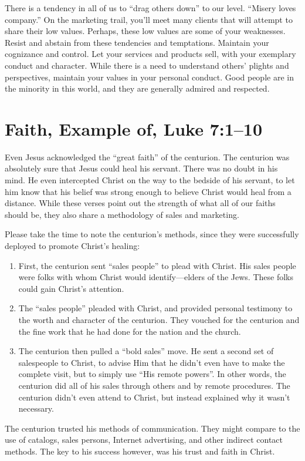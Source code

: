 \documentclass[12pt]{memoir}
\begin{document}
There is a tendency in all of us to ``drag others down'' to our
level. ``Misery loves company.'' On the marketing trail, you'll
meet many clients that will attempt to share their low values. Perhaps,
these low values are some of your weaknesses. Resist and abstain from
these tendencies and temptations. Maintain your cognizance and control.
Let your services and products sell, with your exemplary conduct and
character. While there is a need to understand others' plights and
perspectives, maintain your values in your personal conduct. Good
people are in the minority in this world, and they are generally admired
and respected. 

\section{Faith, Example of, Luke 7:1--10}

Even Jesus acknowledged the ``great faith'' of the centurion. The
centurion was absolutely sure that Jesus could heal his servant. There
was no doubt in his mind. He even intercepted Christ on the way to
the bedside of his servant, to let him know that his belief was strong
enough to believe Christ would heal from a distance. While these verses
point out the strength of what all of our faiths should be, they also
share a methodology of sales and marketing. 

Please take the time to note the centurion's methods, since they were
successfully deployed to promote Christ's healing: 
\begin{enumerate}
\item First, the centurion sent ``sales people'' to plead with Christ.
His sales people were folks with whom Christ would identify---elders
of the Jews. These folks could gain Christ's attention. 
\item The ``sales people'' pleaded with Christ, and provided personal
testimony to the worth and character of the centurion. They vouched
for the centurion and the fine work that he had done for the nation
and the church. 
\item The centurion then pulled a ``bold sales'' move. He sent a second
set of salespeople to Christ, to advise Him that he didn't even have
to make the complete visit, but to simply use ``His remote powers''.
In other words, the centurion did all of his sales through others
and by remote procedures. The centurion didn't even attend to Christ,
but instead explained why it wasn't necessary. 
\end{enumerate}
The centurion trusted his methods of communication. They might compare
to the use of catalogs, sales persons, Internet advertising, and other
indirect contact methods. The key to his success however, was his
trust and faith in Christ.
\end{document}
